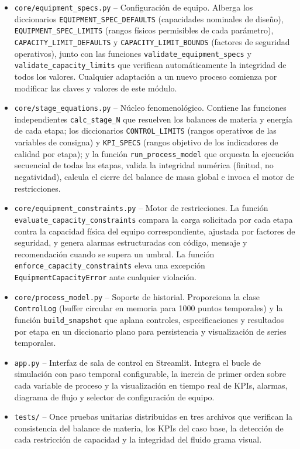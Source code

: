 \documentclass[10pt,letterpaper,twocolumn]{article}
\begin{document}
\begin{itemize}
    \item \texttt{core/equipment\_specs.py} -- Configuración de equipo. Alberga los diccionarios \texttt{EQUIPMENT\_SPEC\_DEFAULTS} (capacidades nominales de diseño), \texttt{EQUIPMENT\_SPEC\_LIMITS} (rangos físicos permisibles de cada parámetro), \texttt{CAPACITY\_LIMIT\_DEFAULTS} y \texttt{CAPACITY\_LIMIT\_BOUNDS} (factores de seguridad operativos), junto con las funciones \texttt{validate\_equipment\_specs} y \texttt{validate\_capacity\_limits} que verifican automáticamente la integridad de todos los valores. Cualquier adaptación a un nuevo proceso comienza por modificar las claves y valores de este módulo.
    \item \texttt{core/stage\_equations.py} -- Núcleo fenomenológico. Contiene las funciones independientes \texttt{calc\_stage\_N} que resuelven los balances de materia y energía de cada etapa; los diccionarios \texttt{CONTROL\_LIMITS} (rangos operativos de las variables de consigna) y \texttt{KPI\_SPECS} (rangos objetivo de los indicadores de calidad por etapa); y la función \texttt{run\_process\_model} que orquesta la ejecución secuencial de todas las etapas, valida la integridad numérica (finitud, no negatividad), calcula el cierre del balance de masa global e invoca el motor de restricciones.
    \item \texttt{core/equipment\_constraints.py} -- Motor de restricciones. La función \texttt{evaluate\_capacity\_constraints} compara la carga solicitada por cada etapa contra la capacidad física del equipo correspondiente, ajustada por factores de seguridad, y genera alarmas estructuradas con código, mensaje y recomendación cuando se supera un umbral. La función \texttt{enforce\_capacity\_constraints} eleva una excepción \texttt{EquipmentCapacityError} ante cualquier violación.
    \item \texttt{core/process\_model.py} -- Soporte de historial. Proporciona la clase \texttt{ControlLog} (buffer circular en memoria para 1000 puntos temporales) y la función \texttt{build\_snapshot} que aplana controles, especificaciones y resultados por etapa en un diccionario plano para persistencia y visualización de series temporales.
    \item \texttt{app.py} -- Interfaz de sala de control en Streamlit. Integra el bucle de simulación con paso temporal configurable, la inercia de primer orden sobre cada variable de proceso y la visualización en tiempo real de KPIs, alarmas, diagrama de flujo y selector de configuración de equipo.
    \item \texttt{tests/} -- Once pruebas unitarias distribuidas en tres archivos que verifican la consistencia del balance de materia, los KPIs del caso base, la detección de cada restricción de capacidad y la integridad del fluido grama visual.
\end{itemize}
\end{document}

